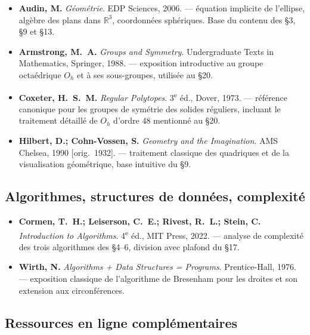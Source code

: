 \documentclass[12pt,a4paper]{scrartcl}
\begin{document}
\begin{itemize}[leftmargin=1.4em,itemsep=0.3em,topsep=0.3em]
  \item \textbf{Audin, M.} \emph{Géométrie}. EDP Sciences, 2006.
        --- équation implicite de l'ellipse, algèbre des plans dans $\mathbb{R}^3$,
        coordonnées sphériques. Base du contenu des §3, §9 et §13.

  \item \textbf{Armstrong, M.~A.} \emph{Groups and Symmetry}. Undergraduate Texts in
        Mathematics, Springer, 1988.
        --- exposition introductive au groupe octaédrique $O_h$ et à ses sous-groupes, utilisée au §20.

  \item \textbf{Coxeter, H.~S.~M.} \emph{Regular Polytopes}. 3\textsuperscript{e} éd., Dover, 1973.
        --- référence canonique pour les groupes de symétrie des solides réguliers, incluant le traitement détaillé de $O_h$ d'ordre 48 mentionné au §20.

  \item \textbf{Hilbert, D.; Cohn-Vossen, S.} \emph{Geometry and the Imagination}.
        AMS Chelsea, 1990 [orig.~1932].
        --- traitement classique des quadriques et de la visualisation géométrique, base intuitive du §9.
\end{itemize}

\subsection*{Algorithmes, structures de données, complexité}

\begin{itemize}[leftmargin=1.4em,itemsep=0.3em,topsep=0.3em]
  \item \textbf{Cormen, T.~H.; Leiserson, C.~E.; Rivest, R.~L.; Stein, C.}
        \emph{Introduction to Algorithms}. 4\textsuperscript{e} éd., MIT Press, 2022.
        --- analyse de complexité des trois algorithmes des §4--6, division avec plafond du §17.

  \item \textbf{Wirth, N.} \emph{Algorithms + Data Structures = Programs}.
        Prentice-Hall, 1976.
        --- exposition classique de l'algorithme de Bresenham pour les droites et son extension aux circonférences.
\end{itemize}

\subsection*{Ressources en ligne complémentaires}
\end{document}
